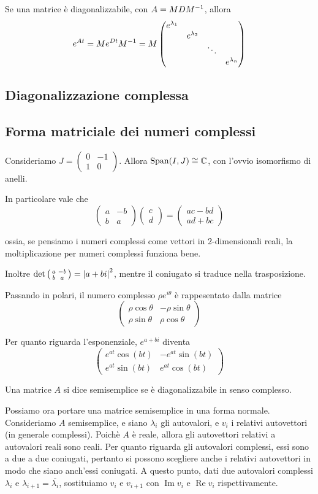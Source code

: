 \documentclass[a4paper,10pt,oneside]{math_article}
\renewcommand{\Re}{\operatorname{Re}}
\renewcommand{\Im}{\operatorname{Im}}
\newcommand{\twovec}[2]{\begin{pmatrix}#1\\#2\end{pmatrix}}
\newcommand{\cmat}[2]{\begin{pmatrix}#1&-#2\\#2&#1\end{pmatrix}}
\newcommand{\scmat}[2]{\left(\begin{smallmatrix}#1&-#2\\#2&#1\end{smallmatrix}\right)}
\let\conj\overline
\begin{document}
		\begin{myprop}
			Se una matrice è diagonalizzabile, con $A=MDM^{-1}$, allora
			\[
				e^{At} = Me^{Dt}M^{-1} = M\begin{pmatrix}
					e^{\lambda_1} \\
					& e^{\lambda_2} \\
					&& \ddots \\
					&&& e^{\lambda_n}
				  \end{pmatrix}
			\]

		\end{myprop}
	
	\subsection{Diagonalizzazione complessa}
		\subsection{Forma matriciale dei numeri complessi}
		
		Consideriamo $J=\cmat 01$. Allora $\operatorname{Span}(I,J) \cong \mathbb C$, con l'ovvio isomorfismo di anelli.
		
		In particolare vale che 
		\[
			\cmat ab \twovec cd = \twovec {ac-bd}{ad+bc} 
		\]

		ossia, se pensiamo i numeri complessi come vettori in 2-dimensionali reali, la moltiplicazione per numeri complessi funziona bene.
		
		Inoltre $\det \scmat ab = \abs{a+bi}^2$, mentre il coniugato si traduce nella trasposizione.
		
		Passando in polari, il numero complesso $\rho e^{i\theta}$ è rappesentato dalla matrice
		\[
			\cmat {\rho\cos \theta}{\rho\sin \theta}
		\]
		
		Per quanto riguarda l'esponenziale, $e^{a+bi}$ diventa
		\[
			\cmat {e^{at} \cos(bt)}{e^{at} \sin(bt)}
		\]

		

		
		\begin{mydef}
			Una matrice $A$ si dice semisemplice se è diagonalizzabile in senso complesso.
		\end{mydef}
		
		Possiamo ora portare una matrice semisemplice in una forma normale.
		Consideriamo $A$ semisemplice, e siano $\lambda_i$ gli autovalori, e $v_i$ i relativi autovettori (in generale complessi).
		Poichè $A$ è reale, allora gli autovettori relativi a autovalori reali sono reali. Per quanto riguarda gli autovalori complessi, essi sono a due a due coniugati, pertanto si possono scegliere anche i relativi autovettori in modo che siano anch'essi coniugati. A questo punto, dati due autovalori complessi $\lambda_i$ e $\lambda_{i+1}=\conj{\lambda_i}$, sostituiamo $v_i$ e $v_{i+1}$ con $\Im v_i$ e $\Re v_i$ rispettivamente. 
		
\end{document}
